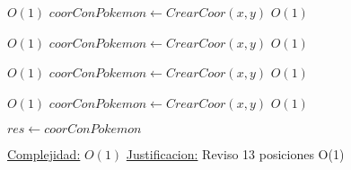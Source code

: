 \begin{Algoritmos}
\begin{algorithmic}[1]
    \EndIf

\EndIf

         \Comment $O(1)$
        \State $coorConPokemon \gets CrearCoor(x, y)$    \Comment $O(1)$
        \EndIf

             \Comment $O(1)$
            \State $coorConPokemon \gets CrearCoor(x, y)$    \Comment $O(1)$
        \EndIf
    \EndIf

             \Comment $O(1)$
            \State $coorConPokemon \gets CrearCoor(x, y)$    \Comment $O(1)$
        \EndIf

    \EndIf
\EndIf

         \Comment $O(1)$
        \State $coorConPokemon \gets CrearCoor(x, y)$    \Comment $O(1)$
    \EndIf
\EndIf

\State $res \gets coorConPokemon$

\medskip
\State \underline{Complejidad:} $O(1)$ %
\State \underline{Justificacion:} Reviso 13 posiciones O(1)

\end{algorithmic}





  
\end{Algoritmos}